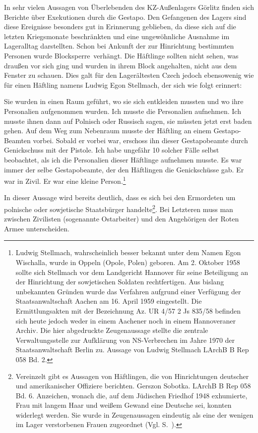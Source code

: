 In sehr vielen Aussagen von Überlebenden des KZ-Außenlagers Görlitz finden sich Berichte über Exekutionen durch die Gestapo. Den Gefangenen des Lagers sind diese Ereignisse besonders gut in Erinnerung geblieben, da diese sich auf die letzten Kriegsmonate beschränkten und eine ungewöhnliche Ausnahme im Lageralltag darstellten. Schon bei Ankunft der zur Hinrichtung bestimmten Personen wurde \glqq Blocksperre\grqq~verhängt. Die Häftlinge sollten nicht sehen, was draußen vor sich ging und wurden in ihrem Block angehalten, nicht aus dem Fenster zu schauen. Dies galt für den Lagerältesten Czech jedoch ebensowenig wie für einen Häftling namens Ludwig Egon Stellmach, der sich wie folgt erinnert:
\begin{leftbar}
Sie wurden in einen Raum geführt, wo sie sich entkleiden mussten und wo ihre Personalien aufgenommen wurden. Ich musste die Personalien aufnehmen. Ich musste ihnen dann auf Polnisch oder Russisch sagen, sie müssten jetzt erst baden gehen. Auf dem Weg zum Nebenraum musste der Häftling an einem Gestapo-Beamten vorbei. Sobald er vorbei war, erschoss ihn dieser Gestapobeamte durch Genickschuss mit der Pistole. Ich habe ungefähr 10 solcher Fälle selbst beobachtet, als ich die Personalien dieser Häftlinge aufnehmen musste. Es war immer der selbe Gestapobeamte, der den Häftlingen die Genickschüsse gab. Er war in Zivil. Er war eine kleine Person.\footnote{Ludwig Stellmach, wahrscheinlich besser bekannt unter dem Namen Egon Wischalla, wurde in Oppeln (Opole, Polen) geboren. Am 2. Oktober 1958 sollte sich Stellmach vor dem Landgericht Hannover für seine Beteiligung an der Hinrichtung der sowjetischen Soldaten rechtfertigen. Aus bislang unbekannten Gründen wurde das Verfahren aufgrund einer Verfügung der Staatsanwaltschaft Aachen am 16. April 1959 eingestellt. Die Ermittlungsakten mit der Bezeichnung Az. UR 4/57 2 Js 835/58 befinden sich heute jedoch weder in einem Aachener noch in einem Hannoveraner Archiv. Die hier abgedruckte Zeugenaussage stellte die zentrale Verwaltungsstelle zur Aufklärung von NS-Verbrechen im Jahre 1970 der Staatsanwaltschaft Berlin zu. Aussage von Ludwig Stellmach LArchB B Rep 058 Bd. 2.}
\end{leftbar}
\newpage
In dieser Aussage wird bereits deutlich, dass es sich bei den Ermordeten um polnische oder sowjetische Staatsbürger handelte\footnote{Vereinzelt gibt es Aussagen von Häftlingen, die von Hinrichtungen deutscher und amerikanischer Offiziere berichten. Gerszon Sobotka. LArchB B Rep 058 Bd. 6. Anzeichen, wonach die, auf dem Jüdischen Friedhof 1948 exhumierte, Frau mit langem Haar und weißem Gewand eine Deutsche sei, konnten widerlegt werden. Sie wurde in Zeugenaussagen eindeutig als eine der wenigen im Lager verstorbenen Frauen zugeordnet (Vgl. S.~\pageref{weiss}).}. Bei Letzteren muss man zwischen Zivilisten (sogenannte Ostarbeiter) und den Angehörigen der Roten Armee unterscheiden.

